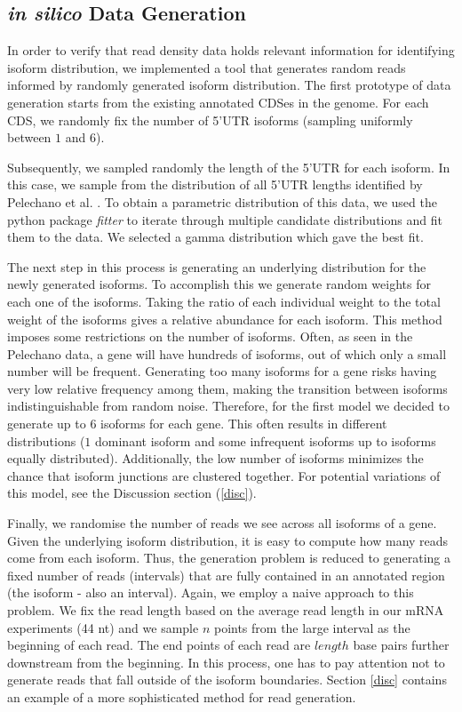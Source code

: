 \documentclass[12pt]{article}
\begin{document}


\subsection{\textit{in silico} Data Generation}

In order to verify that read density data holds relevant information for identifying isoform distribution, we implemented a tool that generates random reads informed by randomly generated isoform distribution. The first prototype of data generation starts from the existing annotated CDSes in the genome. For each CDS, we randomly fix the number of 5'UTR isoforms (sampling uniformly between $1$ and $6$). 

Subsequently, we sampled randomly the length of the 5'UTR for each isoform. In this case, we sample from the distribution of all 5'UTR lengths identified by Pelechano et al. \cite{Pelechano2013}. To obtain a parametric distribution of this data, we used the python package \textit{fitter} to iterate through multiple candidate distributions and fit them to the data. We selected a gamma distribution which gave the best fit. 

The next step in this process is generating an underlying distribution for the newly generated isoforms. To accomplish this we generate random weights for each one of the isoforms. Taking the ratio of each individual weight to the total weight of the isoforms gives a relative abundance for each isoform. This method imposes some restrictions on the number of isoforms. Often, as seen in the Pelechano data, a gene will have hundreds of isoforms, out of which only a small number will be frequent. Generating too many isoforms for a gene risks having very low relative frequency among them, making the transition between isoforms indistinguishable from random noise. Therefore, for the first model we decided to generate up to $6$ isoforms for each gene. This often results in different distributions ($1$ dominant isoform and some infrequent isoforms up to isoforms equally distributed). Additionally, the low number of isoforms minimizes the chance that isoform junctions are clustered together. For potential variations of this model, see the Discussion section (\ref{disc}).

Finally, we randomise the number of reads we see across all isoforms of a gene. Given the underlying isoform distribution, it is easy to compute how many reads come from each isoform. Thus, the generation problem is reduced to generating a fixed number of reads (intervals) that are fully contained in an annotated region (the isoform - also an interval). Again, we employ a naive approach to this problem. We fix the read length based on the average read length in our mRNA experiments (44 nt) and we sample $n$ points from the large interval as the beginning of each read. The end points of each read are $length$ base pairs further downstream from the beginning. In this process, one has to pay attention not to generate reads that fall outside of the isoform boundaries. Section \ref{disc} contains an example of a more sophisticated method for read generation.  
\end{document}
